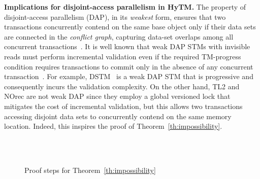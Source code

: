 \vspace{1mm}\noindent\textbf{Implications for disjoint-access parallelism in HyTM.}
The property of disjoint-access parallelism (DAP), in its \emph{weakest} form, ensures that two transactions %
concurrently contend on the same base object 
only if their data 
sets are connected in the \emph{conflict graph}, capturing 
data-set overlaps among all concurrent transactions~\cite{AHM09}. It is well known that weak DAP STMs with invisible reads must perform incremental validation even if the required TM-progress condition requires
transactions to commit only in the absence of any concurrent transaction~\cite{tm-book,prog15-pact}. For example, DSTM~\cite{HLM+03} is a weak DAP STM that is progressive and consequently incurs the validation
complexity. On the other hand, TL2 and NOrec are not weak DAP since they employ a global versioned lock that mitigates the cost of incremental validation, but this allows two transactions accessing
disjoint data sets to concurrently contend on the same memory location. Indeed, this inspires the proof of Theorem~\ref{th:impossibility}. 
\begin{figure*}[!t]
\begin{center}
        \\
        \vspace{1mm}
	\\
	\vspace{1mm}
	\caption{Proof steps for Theorem~\ref{th:impossibility}
        \label{fig:indis}} 
\end{center}
\end{figure*}
